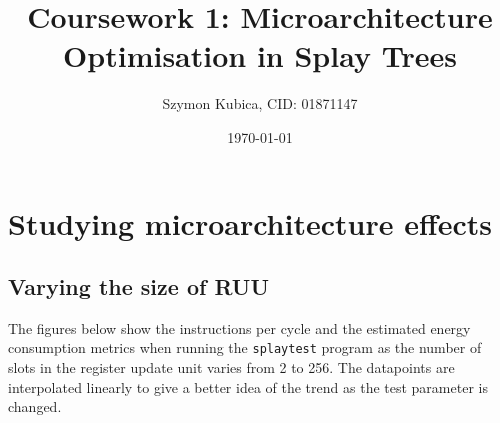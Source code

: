 \documentclass[11pt]{article}
\begin{document}
\title{Coursework 1: Microarchitecture Optimisation in Splay Trees}
\date{\today}
\author{Szymon Kubica, CID: 01871147}
\maketitle

\vspace{-1em}
\section*{Studying microarchitecture effects}
\vspace{-1em}
\subsection*{Varying the size of RUU }
\vspace{-0.5em}

The figures below show the instructions per cycle and the estimated energy
consumption metrics when running the \texttt{splaytest} program as the number
of slots in the register update unit varies from 2 to 256. The datapoints are
interpolated linearly to give a better idea of the trend as the test parameter
is changed.
\end{document}
